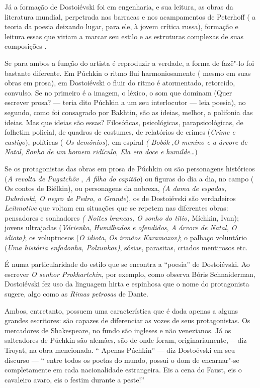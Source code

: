 Já a formação de Dostoiévski foi em engenharia, e sua leitura, as obras
da literatura mundial, perpetrada nas barracas e nos acampamentos de
Peterhoff ( a teoria da poesia deixando lugar, para ele, à jovem crítica
russa), formação e leitura essas que viriam a marcar seu estilo e as
estruturas complexas de suas composições .

Se para ambos a função do artista é reproduzir a verdade, a forma de
fazê"-lo foi bastante diferente. Em Púchkin o ritmo flui harmoniosamente
( mesmo em suas obras em prosa), em Dostoiévski o fluir do ritmo é
atormentado, retorcido, convulso. Se no primeiro é a imagem, o léxico, o
som que dominam (Quer escrever prosa? --- teria dito Púchkin a um seu
interlocutor --- leia poesia), no segundo, como foi consagrado por
Bakhtin, são as ideias, melhor, a polifonia das ideias. Mas que ideias
são essas? Filosóficas, psicológicas, parapsicológicas, de folhetim
policial, de quadros de costumes, de relatórios de crimes (\emph{Crime e
castigo}), políticas ( \emph{Os demônios}), em espiral \emph{( Bobók}
,\emph{O menino e a árvore de Natal}, \emph{Sonho de um homem ridículo},
\emph{Ela era doce e humilde}\ldots{})

Se os protagonistas das obras em prosa de Púchkin ou são personagens
históricos (\emph{A revolta de Pugatchôv} , \emph{A filha do}
\emph{capitão}) ou figuras do dia a dia, no campo ( Os contos de
Biélkin), ou personagens da nobreza, \emph{(A dama de espadas,
Dubróvski, O negro de Pedro, o Grande}), os de Dostoiévski são
verdadeiros \emph{Leitmotive} que voltam em situações que se repetem nas
diferentes obras: pensadores e sonhadores \emph{( Noites brancas, O
sonho do titio,} Míchkin, Ivan); jovens ultrajadas (\emph{Várienka},
\emph{Humilhados e ofendidos}, \emph{A árvore de Natal, O idiota)}; os
voluptuosos (\emph{O idiota}, \emph{Os irmãos Karamazov)}; o palhaço
voluntário (\emph{Uma história enfadonha, Polzunkov)}, sósias,
parasitas, criados mentirosos etc.

É numa particularidade do estilo que se encontra a ``poesia'' de
Dostoiévski. Ao escrever \emph{O senhor Prokhartchin}, por exemplo, como
observa Bóris Schnaiderman, Dostoiévski fez uso da linguagem hirta e
espinhosa que o nome do protagonista sugere, algo como as \emph{Rimas
petrosas} de Dante.

Ambos, entretanto, possuem uma característica que é dada apenas a alguns
grandes escritores: são capazes de diferenciar as vozes de seus
protagonistas. Os mercadores de Shakespeare, no fundo são ingleses e não
venezianos. Já os salteadores de Púchkin são alemães, são de onde foram,
originariamente, -\/- diz Troyat, na obra mencionada. `` Apenas
Púchkin'' --- diz Dostoévski em seu discurso --- `` entre todos os poetas
do mundo, possui o dom de encarnar"-se completamente em cada
nacionalidade estrangeira. Eis a cena do Faust, eis o cavaleiro avaro,
eis o festim durante a peste!''

